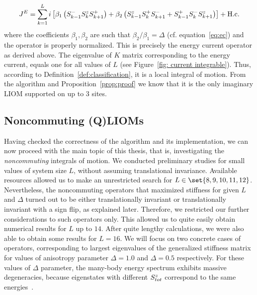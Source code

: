 \begin{equation}
    J^E = \sum_{k=1}^L i\left[\beta_1 \left(S^{-}_{k-1}S^{z}_{k}S^{+}_{k+1}\right) + \beta_2 \left(S^{z}_{k-1}S^{+}_{k}S^{-}_{k+1}+S^{+}_{k-1}S^{-}_{k}S^{z}_{k+1}\right)\right] + \text{H.c.}
\end{equation}
where the coefficients \(\beta_1,\beta_2\) are such that \(\beta_2/\beta_1 = \Delta\) (cf. equation~\eqref{eq:ec})
and the operator is properly normalized. This is precisely the energy current
operator as derived above. The eigenvalue of \(K\) matrix corresponding to the energy current,
equals one for all values of \(L\) (see Figure~\ref{fig: current integrable}).
Thus, according to Definition~\ref{def:classification}, it is a local integral of motion.
From the algorithm and Proposition~\ref{prop:proof} we know that it is the only
imaginary LIOM supported on up to \(3\) sites. 

\subsection{Noncommuting (Q)LIOMs\label{subsec:noncomm qlioms}}
Having checked the correctness of the algorithm and its implementation, we can now proceed with the
main topic of this thesis, that is, investigating the \textit{noncommuting} integrals of motion. 
We conducted preliminary studies for small values of system size \(L\), without assuming
translational invariance. Available resources allowed us to make an unrestricted search for
 \(L \in \set{8,9,10,11,12}\). Nevertheless, the noncommuting operators that maximized stiffness for given 
 \(L\) and \(\Delta \) turned out to be either translationally invariant or translationally invariant with
 a sign flip, as explained later. Therefore, we restricted our further 
considerations to such operators only. This allowed us to quite easily obtain numerical
results for \(L\) up to \(14\). After quite lengthy calculations, we were also able
to obtain some results for \(L=16\).
We will focus on two concrete cases of operators, corresponding
to largest eigenvalues of the generalized stiffness matrix for values of anisotropy
parameter \(\Delta=1.0\) and \(\Delta=0.5\) respectively. For these values of
\( \Delta \) parameter, the many-body energy spectrum exhibits massive degeneracies, because
eigenstates with different \(S^{z}_{tot}\) correspond to the same energies~\autocite{Fagotti2014,Mierzejewski2021}.

